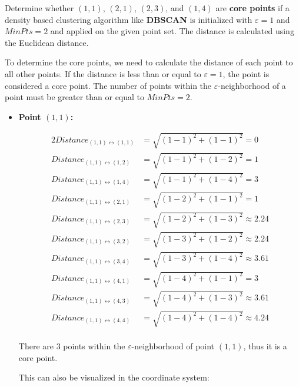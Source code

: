 \documentclass[
english,
smallborders
]{i6prcsht}
\begin{document}
Determine whether  $(1,1)$, $(2,1)$, $(2,3)$, and $(1,4)$ are \textbf{core points} if a density based clustering algorithm like \textbf{DBSCAN} is initialized with $\varepsilon = 1$ and $MinPts = 2$ and applied on the given point set. The distance is calculated using the Euclidean distance.

\begin{solution}
	To determine the core points, we need to calculate the distance of each point to all other points. If the distance is less than or equal to $\varepsilon = 1$, the point is considered a core point. The number of points within the $\varepsilon$-neighborhood of a point must be greater than or equal to $MinPts = 2$.

	\begin{itemize}
		\item \textbf{Point $(1,1)$:}

		      \begin{alignat*}{2}
			      Distance_{(1,1)\leftrightarrow(1,1)} & = \sqrt{(1-1)^2+(1-1)^2} = 0          \\
			      Distance_{(1,1)\leftrightarrow(1,2)} & = \sqrt{(1-1)^2+(1-2)^2} = 1          \\
			      Distance_{(1,1)\leftrightarrow(1,4)} & = \sqrt{(1-1)^2+(1-4)^2} = 3          \\
			      Distance_{(1,1)\leftrightarrow(2,1)} & = \sqrt{(1-2)^2+(1-1)^2} = 1          \\
			      Distance_{(1,1)\leftrightarrow(2,3)} & = \sqrt{(1-2)^2+(1-3)^2} \approx 2.24 \\
			      Distance_{(1,1)\leftrightarrow(3,2)} & = \sqrt{(1-3)^2+(1-2)^2} \approx 2.24 \\
			      Distance_{(1,1)\leftrightarrow(3,4)} & = \sqrt{(1-3)^2+(1-4)^2} \approx 3.61 \\
			      Distance_{(1,1)\leftrightarrow(4,1)} & = \sqrt{(1-4)^2+(1-1)^2} = 3          \\
			      Distance_{(1,1)\leftrightarrow(4,3)} & = \sqrt{(1-4)^2+(1-3)^2} \approx 3.61 \\
			      Distance_{(1,1)\leftrightarrow(4,4)} & = \sqrt{(1-4)^2+(1-4)^2} \approx 4.24 \\
		      \end{alignat*}

		      There are 3 points within the $\varepsilon$-neighborhood of point $(1,1)$, thus it is a core point.

		      \dotfill

		      This can also be visualized in the coordinate system:


\end{itemize}
\end{solution}
\end{document}
